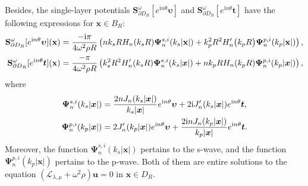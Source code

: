 \documentclass[10pt,a4paper]{amsart}
\newcommand{\bx}{\mathbf{x}}
\begin{document}
\begin{lem}
	Besides, the single-layer potentials $\mathbf{S}_{\partial D_{R}}^{\omega}[e^{\mathrm{i}n\theta}\bm{\upsilon}]$ and $\mathbf{S}_{\partial D_{R}}^{\omega}[e^{\mathrm{i}n\theta}\bm{t}]$ have the following expressions for $\bx\in B_R$:
	\begin{align}\label{lem:qninut}
		\mathbf{S}_{\partial D_{R}}^{\omega}[e^{\mathrm{i}n\theta}\bm{\upsilon }](\bx)&=\frac{-\mathrm{i}\pi}{4\omega^{2}\rho R}\left(nk_{s}RH_{n}(k_{s}R)\bm{\Psi}_{n}^{s,i}(k_{s}|\bx|)+k_{p}^{2}R^{2}H_{n}^{\prime}\big(k_{p}R\big)\bm{\Psi}_{n}^{p,i}(k_{p}|\mathbf{x}|)\right),\\
		\mathbf{S}_{\partial D_{R}}^{\omega}[e^{\mathrm{i}n\theta}\bm{t}](\bx)&=\frac{-\pi}{4\omega^{2}\rho R}\left(k_{s}^{2}R^{2}H_{n}^{\prime}(k_{s}R)\bm{\Psi}_{n}^{s,i}(k_{s}|\bm{x}|)+nk_{p}RH_{n}(k_{p}R)\bm{\Psi}_{n}^{p,i}(k_{p}|\bm{x}|)\right),\notag
	\end{align}
	where
	\begin{align}
		\bm{\Psi}_{n}^{s,i}(k_{s}|\bm{x}|)&=\frac{2nJ_{n}(k_{s}|\bm{x}|)}{k_{s}|\bm{x}|}e^{\mathrm{i}n\theta}\bm{\upsilon}+2\mathrm{i}J_{n}^{\prime}(k_{s}|\bm{x}|)e^{\mathrm{i}n\theta}\bm{t},\label{lem:qni}\\
		\bm{\Psi}_{n}^{p,i}(k_{p}|\bm{x}|)&=2J_{n}^{\prime}(k_{p}|\bm{x}|)e^{\mathrm{i}n\theta}\bm{\upsilon}+\frac{2\mathrm{i}nJ_{n}(k_{p}|\bm{x}|)}{k_{p}|\bm{x}|}e^{\mathrm{i}n\theta}\bm{t}.\notag
	\end{align}
	Moreover, the function $\bm{\Psi}_{n}^{s,i}(k_{s}|\mathbf{x}|)$  pertains to the s-wave, and the function $\bm{\Psi}_{n}^{p,i}(k_p|\mathbf{x}|)$ pertains to the p-wave. Both of them are entire solutions to the equation $(\mathcal{L}_{\lambda,\mu}+\omega^{2}{\rho} )\mathbf{u}=0$ in $\bx\in{D}_{R}$.
\end{lem}
\end{document}

